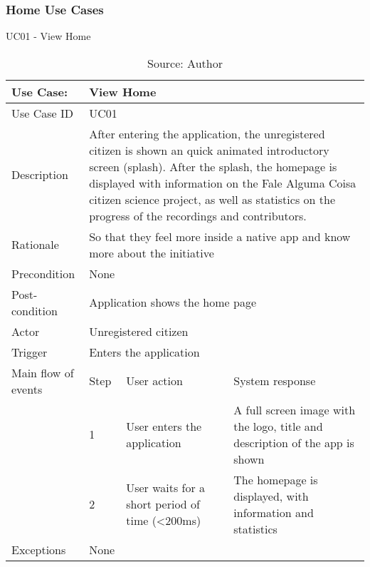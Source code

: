 \clearpage
\subsubsection{Home Use Cases}

\begin{table}[h]
\centering
\caption{UC01 - View Home}
\label{uc:01}
\begin{tabular}{|p{3cm}|p{1cm}|p{5cm}|p{5cm}|}
\hline
Use Case:       & \multicolumn{3}{p{11cm}|}{View Home} \\ \hline
Use Case ID     & \multicolumn{3}{p{11cm}|}{UC01} \\ \hline
Description     & \multicolumn{3}{p{11cm}|}{After entering the application, the unregistered citizen is shown an quick animated introductory screen (splash). After the splash, the homepage is displayed with information on the Fale Alguma Coisa citizen science project, as well as statistics on the progress of the recordings and contributors.} \\ \hline
Rationale       & \multicolumn{3}{p{11cm}|}{So that they feel more inside a native app and know more about the initiative} \\ \hline
Precondition    & \multicolumn{3}{p{11cm}|}{None} \\ \hline
Post-condition  & \multicolumn{3}{p{11cm}|}{Application shows the home page} \\ \hline
Actor           & \multicolumn{3}{p{11cm}|}{Unregistered citizen} \\ \hline
Trigger         & \multicolumn{3}{p{11cm}|}{Enters the application} \\ \hline
Main flow of events & Step  & User action & System response \\ \hline
                    & 1     & User enters the application & A full screen image with the logo, title and description of the app is shown \\ \hline
                    & 2     & User waits for a short period of time (<200ms) & The homepage is displayed, with information and statistics \\ \hline
Exceptions      & \multicolumn{3}{p{11cm}|}{None} \\ \hline
\end{tabular}
\caption*{Source: Author}
\end{table}

